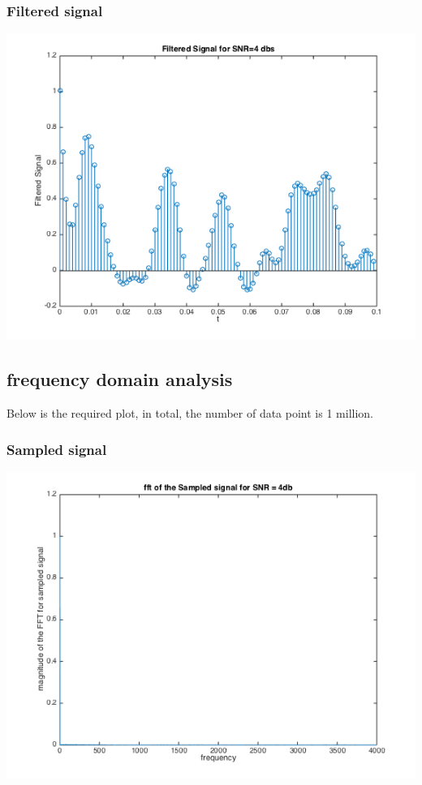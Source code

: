 \documentclass[11pt]{scrartcl}
\begin{document}
\subsubsection{Filtered signal}
\begin{minipage}[t]{\linewidth}
{
\includegraphics[scale = 0.6]{filtered_signal.png}
}
\end{minipage}
\medskip


\subsection{frequency domain analysis }
Below is the required plot, in total, the number of data point is 1 million.
\subsubsection{Sampled signal}
\begin{minipage}[t]{\linewidth}
{
\includegraphics[scale = 0.6]{sampled_signal_fft.png}
}
\end{minipage}
\medskip
\end{document}
